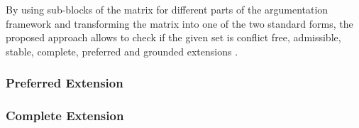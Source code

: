 By using sub-blocks of the matrix for different parts of the argumentation framework and transforming the matrix into one of the two standard forms, the proposed approach allows to check if the given set is conflict free, admissible, stable, complete, preferred and grounded extensions \citep{matrix2}.

\subsubsection{Preferred Extension}
\subsubsection{Complete Extension}